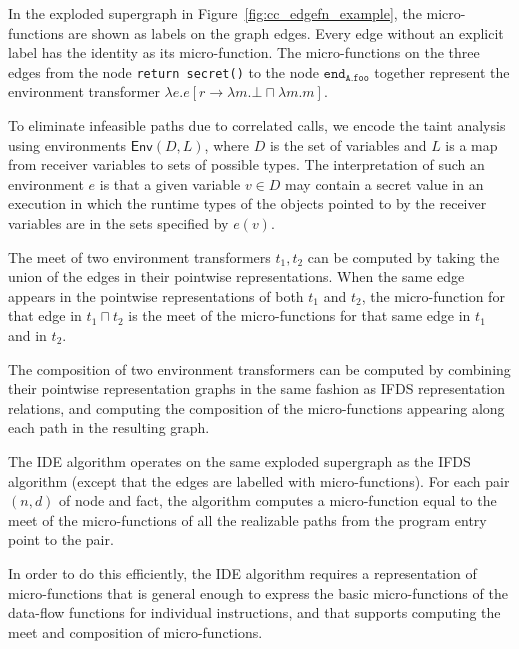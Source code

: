 \begin{example}
    In the exploded supergraph in Figure~\ref{fig:cc_edgefn_example},
    the micro-functions are shown as labels on the graph edges.
    Every edge without an explicit label has the identity as its
    micro-function. The micro-functions on the three edges from
    the node \verb+return secret()+ to the node $\texttt{end}_\texttt{A.foo}$
    together represent the environment transformer 
    $\lambda e.e[r \to \lambda m.\bot \sqcap \lambda m.m]$.

    To eliminate infeasible paths due to correlated calls, we encode the taint
    analysis using environments $\textsf{Env}(D,L)$, where $D$ is the set of
    variables and $L$ is a map from receiver variables to sets of possible
    types. The interpretation of such an environment $e$ is that a given variable
    $v \in D$ may contain a secret value in an execution in which the runtime
    types of the objects pointed to by the receiver variables are in the sets
    specified by $e(v)$.
\end{example}

The meet of two environment transformers $t_1, t_2$ can be computed by taking the union of the edges
in their pointwise representations. When the same edge appears in the pointwise representations of
both $t_1$ and $t_2$, the micro-function for that edge in $t_1 \sqcap t_2$ is the meet of the
micro-functions for that same edge in $t_1$ and in $t_2$.

The composition of two environment transformers can be computed by combining their pointwise
representation graphs in the same fashion as IFDS representation relations, and 
computing the composition of the micro-functions appearing along each path in the resulting graph.

The IDE algorithm operates on the same exploded supergraph as the IFDS algorithm
(except that the edges are labelled with micro-functions). For each pair $(n,d)$ of
node and fact, the algorithm computes a micro-function equal to the meet of the micro-functions
of all the realizable paths from the program entry point to the pair.

In order to do this efficiently, the IDE algorithm requires a representation of micro-functions
that is general enough to express the basic micro-functions of the data-flow functions for individual
instructions, and that supports computing the meet and composition of micro-functions.

